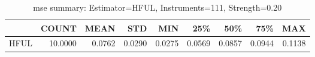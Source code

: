 \begin{table}[ht]
\centering
\caption{mse summary: Estimator=HFUL, Instruments=111, Strength=0.20}
\begin{tabular}{lrrrrrrrr}
\toprule
 & COUNT & MEAN & STD & MIN & 25\% & 50\% & 75\% & MAX \\
\midrule
HFUL & 10.0000 & 0.0762 & 0.0290 & 0.0275 & 0.0569 & 0.0857 & 0.0944 & 0.1138 \\
\bottomrule
\end{tabular}
\end{table}
